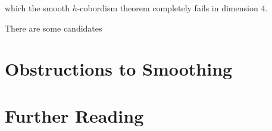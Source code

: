 which the smooth $h$-cobordism theorem completely fails in dimension $4$.

There are some candidates


\section{Obstructions to Smoothing}\label{sec:smoothing-obstructions}

\begin{theorem}[Freedman, 1982]\label{thm:freedman-actual}
\end{theorem}


\section{Further Reading}

\cite{witten1985anomalies}
